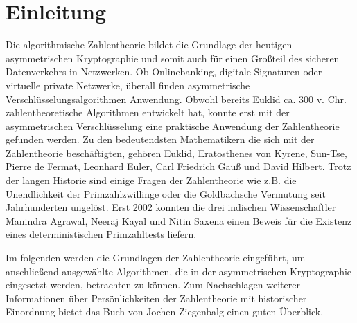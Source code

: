 \section{Einleitung}
	Die algorithmische Zahlentheorie bildet die Grundlage der heutigen asymmetrischen Kryptographie und somit auch für einen Großteil des sicheren Datenverkehrs in Netzwerken. Ob Onlinebanking, digitale Signaturen oder virtuelle private Netzwerke, überall finden asymmetrische Verschlüsselungsalgorithmen Anwendung. Obwohl bereits Euklid ca. 300 v. Chr. zahlentheoretische Algorithmen entwickelt hat, konnte erst mit der asymmetrischen Verschlüsselung eine praktische Anwendung der Zahlentheorie gefunden werden. Zu den bedeutendsten Mathematikern die sich mit der Zahlentheorie beschäftigten, gehören Euklid, Eratosthenes von Kyrene, Sun-Tse, Pierre de Fermat, Leonhard Euler, Carl Friedrich Gauß und David Hilbert. Trotz der langen Historie sind einige Fragen der Zahlentheorie wie z.B. die Unendlichkeit der Primzahlzwillinge oder die Goldbachsche Vermutung seit Jahrhunderten ungelöst. Erst 2002 konnten die drei indischen Wissenschaftler Manindra Agrawal, Neeraj Kayal und Nitin Saxena einen Beweis für die Existenz eines deterministischen Primzahltests liefern.\cite{Primes:is:in:P}
	
	Im folgenden werden die Grundlagen der Zahlentheorie eingeführt, um anschließend ausgewählte Algorithmen, die in der asymmetrischen Kryptographie eingesetzt werden, betrachten zu können. Zum Nachschlagen weiterer Informationen über Persönlichkeiten der Zahlentheorie mit historischer Einordnung bietet das Buch \cite{Elementare:Zahlentheorie} von Jochen Ziegenbalg einen guten Überblick.